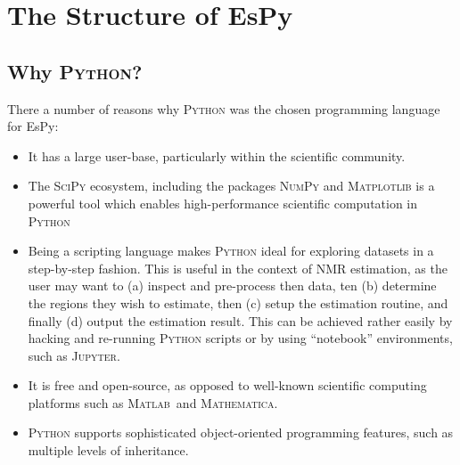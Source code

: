 \section{The Structure of \acs{EsPy}}

\subsection{Why \textsc{Python}?}
There a number of reasons why \textsc{Python} was the chosen programming
language for \ac{EsPy}:
\begin{itemize}
    \item It has a large user-base, particularly within the scientific
        community.
    \item The \textsc{SciPy} ecosystem\cite{Virtanen2020}, including the packages
        \textsc{NumPy}\cite{Harris2020} and
        \textsc{Matplotlib}\cite{Hunter2007} is a powerful tool which enables
        high-performance scientific computation in \textsc{Python}
    \item Being a scripting language makes \textsc{Python} ideal for
        exploring datasets in a step-by-step fashion. This is useful in the
        context of \ac{NMR} estimation, as the user may want to
        (a) inspect and pre-process then data, ten (b) determine the regions
        they wish to estimate, then (c) setup the estimation routine, and
        finally (d) output the estimation result. This can be achieved rather
        easily by hacking and re-running \textsc{Python} scripts or by using
        ``notebook'' environments, such as \textsc{Jupyter}.
    \item It is free and open-source, as opposed to well-known scientific
        computing platforms such as \textsc{Matlab}\textregistered\ and
        \textsc{Mathematica}.
    \item \textsc{Python} supports sophisticated object-oriented programming
        features, such as multiple levels of inheritance.
\end{itemize}

